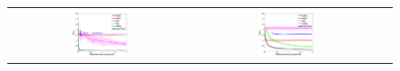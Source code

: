 \documentclass{article}
\newcommand{\nnn}{0.33}
\newcommand{\nnh}{0.23}
\begin{document}
\begin{figure}[t!]
\vspace{-0mm}
\begin{center}
\begin{tabular}{ccc}
   \hspace{-5mm} \includegraphics[width=\nnn\textwidth, height=\nnh\textwidth]{plotsx/conductancex/err-vs-time__param4-shaded.pdf} 
& \hspace{-3mm} \includegraphics[width=\nnn\textwidth, height=\nnh\textwidth]{plotsx/conductancex/err-vs-time__param30-shaded.pdf} 

\end{tabular}
\end{center}
\end{figure}
\end{document}
